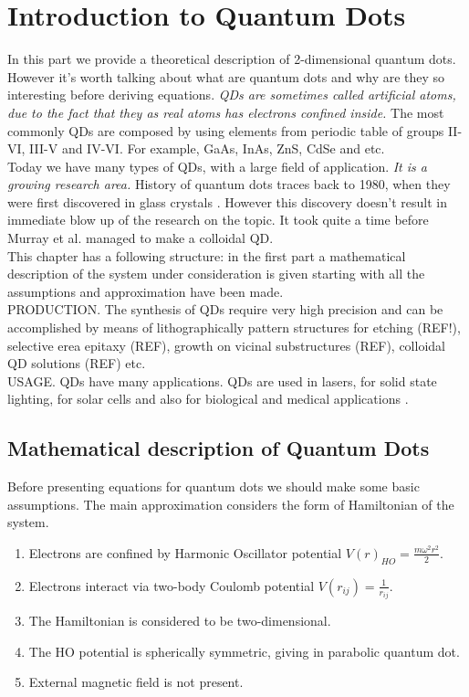 \documentclass[twoside,english]{uiofysmaster}
\theoremstyle{definition}
\begin{document}
\section{Introduction to Quantum Dots}
In this part we provide a theoretical description of 2-dimensional quantum dots. However it's worth talking about what are quantum dots and why are they so interesting before deriving equations. \textit{QDs are sometimes called artificial atoms, due to the fact that they as real atoms has electrons confined inside.} The most commonly QDs are composed by using elements from periodic table of groups II-VI, III-V and IV-VI. For example, GaAs, InAs, ZnS, CdSe and etc.\\
Today we have many types of QDs, with a large field of application. \textit{It is a growing research area.} History of quantum dots traces back to 1980, when they were first discovered in glass crystals \cite{ekimovaiQuantumSizeEffect1981}. However this discovery doesn't result in immediate blow up of the research on the topic. It took quite a time before Murray et al. \cite{murraySynthesisCharacterizationNearly1993} managed to make a colloidal QD. \\
This chapter has a following structure: in the first part a mathematical description of the system under consideration is given starting with all the assumptions and approximation have been made.\\
PRODUCTION. The synthesis of QDs require very high precision and can be accomplished by means of lithographically pattern structures for etching (REF!), selective erea epitaxy (REF), growth on vicinal substructures (REF), colloidal QD solutions (REF) etc.\\  
USAGE. QDs have many applications. QDs are used in lasers, for solid state lighting, for solar cells and also for biological and medical applications \cite{zhuQuantumDots2013}. 

\subsection{Mathematical description of Quantum Dots}\label{sec:math_qd}
Before presenting equations for quantum dots we should make some basic assumptions. The main approximation considers the form of Hamiltonian of the system.\\
\begin{enumerate}
	\item Electrons are confined by Harmonic Oscillator potential $V(r)_{HO}=\frac{m\omega^2 r^2}{2}$.
	\item Electrons interact via two-body Coulomb potential  $V(r_{ij})=\frac{1}{r_{ij}}$.
	\item The Hamiltonian is considered to be two-dimensional.
	\item The HO potential is spherically symmetric, giving in parabolic quantum dot.
	\item External magnetic field is not present.
\end{enumerate}
\end{document}
